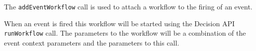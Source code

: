 The \verb+addEventWorkflow+ call is used to attach a workflow to the firing of an event.

When an event is fired this workflow will be started using the Decision API \verb+runWorkflow+ call. The parameters to
the workflow will be a combination of the event context parameters and the parameters to this call.
